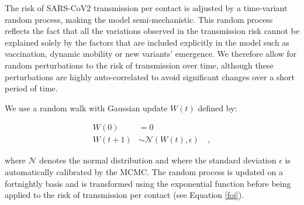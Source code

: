 The risk of SARS-CoV2 transmission per contact is adjusted by a time-variant random process, making
the model semi-mechanistic. This random process reflects the fact that all the variations observed in the transmission
risk cannot be explained solely by the factors that are included explicitly in the model such as vaccination, dynamic mobility or new variants' emergence.
We therefore allow for random perturbations to the risk of transmission over time, although these perturbations are highly auto-correlated
to avoid significant changes over a short period of time.

We use a random walk with Gaussian update $W(t)$  defined by:

\begin{equation}
    \begin{split}
    W(0) & = 0 \\
    W(t+1) & \sim \mathcal{N}(W(t), \epsilon) \quad ,
    \end{split}
\end{equation}

where $\mathcal{N}$ denotes the normal distribution and where the standard deviation $\epsilon$ is automatically calibrated by the MCMC.
The random process is updated on a fortnightly basis and is transformed using the exponential function before being applied to the risk of transmission per contact (see Equation \ref{foi}).